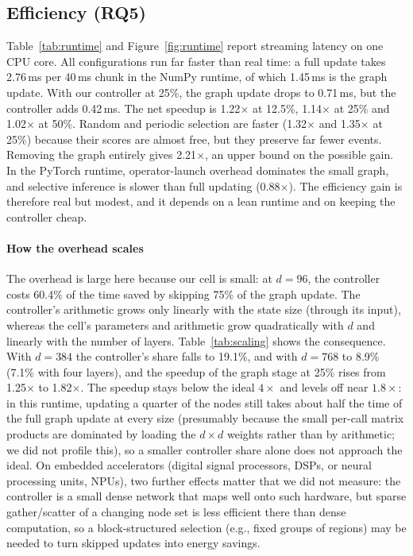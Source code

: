 
\runtimetable

\subsection{Efficiency (RQ5)}
\label{sec:h3}
Table~\ref{tab:runtime} and Figure~\ref{fig:runtime} report streaming latency on one CPU core. All configurations run far faster than real time: a full update takes 2.76\,ms per 40\,ms chunk in the NumPy runtime, of which 1.45\,ms is the graph update. With our controller at 25\%, the graph update drops to 0.71\,ms, but the controller adds 0.42\,ms. The net speedup is 1.22$\times$ at 12.5\%, 1.14$\times$ at 25\% and 1.02$\times$ at 50\%. Random and periodic selection are faster (1.32$\times$ and 1.35$\times$ at 25\%) because their scores are almost free, but they preserve far fewer events. Removing the graph entirely gives 2.21$\times$, an upper bound on the possible gain. In the PyTorch runtime, operator-launch overhead dominates the small graph, and selective inference is slower than full updating (0.88$\times$). The efficiency gain is therefore real but modest, and it depends on a lean runtime and on keeping the controller cheap.

\paragraph*{How the overhead scales} The overhead is large here because our cell is small: at $d{=}96$, the controller costs 60.4\% of the time saved by skipping 75\% of the graph update. The controller's arithmetic grows only linearly with the state size (through its input), whereas the cell's parameters and arithmetic grow quadratically with $d$ and linearly with the number of layers. Table~\ref{tab:scaling} shows the consequence. With $d{=}384$ the controller's share falls to 19.1\%, and with $d{=}768$ to 8.9\% (7.1\% with four layers), and the speedup of the graph stage at 25\% rises from 1.25$\times$ to 1.82$\times$. The speedup stays below the ideal $4\times$ and levels off near $1.8\times$: in this runtime, updating a quarter of the nodes still takes about half the time of the full graph update at every size (presumably because the small per-call matrix products are dominated by loading the $d\times d$ weights rather than by arithmetic; we did not profile this), so a smaller controller share alone does not approach the ideal. On embedded accelerators (digital signal processors, DSPs, or neural processing units, NPUs), two further effects matter that we did not measure: the controller is a small dense network that maps well onto such hardware, but sparse gather/scatter of a changing node set is less efficient there than dense computation, so a block-structured selection (e.g., fixed groups of regions) may be needed to turn skipped updates into energy savings.

